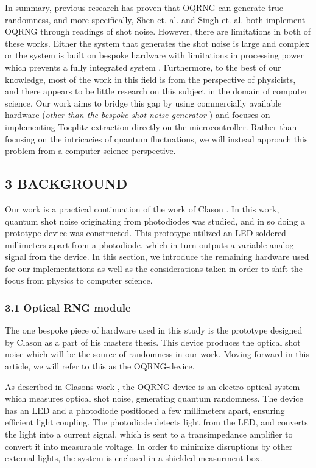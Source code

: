 \documentclass{sigchi}
\begin{document}
In summary, previous research has proven that OQRNG can generate true randomness, and more specifically, Shen et. al. \cite{contender1} and Singh et. al. \cite{singh} both implement OQRNG through readings of shot noise. However, there are limitations in both of these works. Either the system that generates the shot noise is large and complex \cite{contender1} or the system is built on bespoke hardware with limitations in processing power which prevents a fully integrated system \cite{singh}. Furthermore, to the best of our knowledge, most of the work in this field is from the perspective of physicists, and there appears to be little research on this subject in the domain of computer science. Our work aims to bridge this gap by using commercially available hardware (\emph{other than the bespoke shot noise generator \cite{Clason2023}}) and focuses on implementing Toeplitz extraction directly on the microcontroller. Rather than focusing on the intricacies of quantum fluctuations, we will instead approach this problem from a computer science perspective.

\subsection{3 BACKGROUND}\label{background}

Our work is a practical continuation of the work of Clason \cite{Clason2023}. In this work, quantum shot noise originating from photodiodes was studied, and in so doing a prototype device was constructed. This prototype utilized an LED soldered millimeters apart from a photodiode, which in turn outputs a variable analog signal from the device. In this section, we introduce the remaining hardware used for our implementations as well as the considerations taken in order to shift the focus from physics to computer science.

\subsubsection{3.1 Optical RNG module}\label{optical-rng-module}

The one bespoke piece of hardware used in this study is the prototype designed by Clason \cite{Clason2023} as a part of his masters thesis. This device produces the optical shot noise which will be the source of randomness in our work. Moving forward in this article, we will refer to this as the OQRNG-device.

As described in Clasons work \cite{Clason2023}, the OQRNG-device is an electro-optical system which measures optical shot noise, generating quantum randomness. The device has an LED and a photodiode positioned a few millimeters apart, ensuring efficient light coupling. The photodiode detects light from the LED, and converts the light into a current signal, which is sent to a transimpedance amplifier to convert it into measurable voltage. In order to minimize disruptions by other external lights, the system is enclosed in a shielded measurment box.
\end{document}
